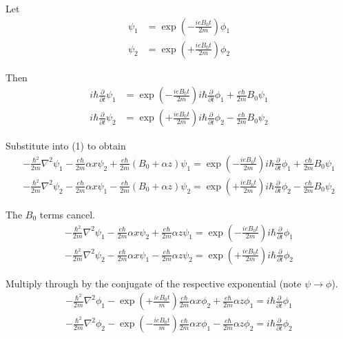 \bigskip
Let
\begin{align*}
\psi_1&=\exp\left(-\frac{ieB_0t}{2m}\right)\phi_1
\\
\psi_2&=\exp\left(+\frac{ieB_0t}{2m}\right)\phi_2
\end{align*}

Then
\begin{equation*}
\begin{aligned}
i\hbar\frac{\partial}{\partial t}\psi_1
&=\exp\left(-\frac{ieB_0t}{2m}\right)i\hbar\frac{\partial}{\partial t}\phi_1
+\frac{e\hbar}{2m}B_0\psi_1
\\
i\hbar\frac{\partial}{\partial t}\psi_2
&=\exp\left(+\frac{ieB_0t}{2m}\right)i\hbar\frac{\partial}{\partial t}\phi_2
-\frac{e\hbar}{2m}B_0\psi_2
\end{aligned}
\tag{2}
\end{equation*}

Substitute into (1) to obtain
\begin{align*}
-\frac{\hbar^2}{2m}\nabla^2\psi_1
-\frac{e\hbar}{2m}\alpha x\psi_2
+\frac{e\hbar}{2m}(B_0+\alpha z)\psi_1
=\exp\left(-\frac{ieB_0t}{2m}\right)i\hbar\frac{\partial}{\partial t}\phi_1
+\frac{e\hbar}{2m}B_0\psi_1
\\[1ex]
-\frac{\hbar^2}{2m}\nabla^2\psi_2
-\frac{e\hbar}{2m}\alpha x\psi_1
-\frac{e\hbar}{2m}(B_0+\alpha z)\psi_2
=\exp\left(+\frac{ieB_0t}{2m}\right)i\hbar\frac{\partial}{\partial t}\phi_2
-\frac{e\hbar}{2m}B_0\psi_2
\end{align*}

The $B_0$ terms cancel.
\begin{align*}
-\frac{\hbar^2}{2m}\nabla^2\psi_1
-\frac{e\hbar}{2m}\alpha x\psi_2
+\frac{e\hbar}{2m}\alpha z\psi_1
=\exp\left(-\frac{ieB_0t}{2m}\right)i\hbar\frac{\partial}{\partial t}\phi_1
\\[1ex]
-\frac{\hbar^2}{2m}\nabla^2\psi_2
-\frac{e\hbar}{2m}\alpha x\psi_1
-\frac{e\hbar}{2m}\alpha z\psi_2
=\exp\left(+\frac{ieB_0t}{2m}\right)i\hbar\frac{\partial}{\partial t}\phi_2
\end{align*}

Multiply through by the conjugate of the respective exponential
(note $\psi\rightarrow\phi$).
\begin{equation*}
\begin{aligned}
-\frac{\hbar^2}{2m}\nabla^2\phi_1
-\exp\left(+\frac{ieB_0t}{m}\right)\frac{e\hbar}{2m}\alpha x\phi_2
+\frac{e\hbar}{2m}\alpha z\phi_1
=i\hbar\frac{\partial}{\partial t}\phi_1
\\[1ex]
-\frac{\hbar^2}{2m}\nabla^2\phi_2
-\exp\left(-\frac{ieB_0t}{m}\right)\frac{e\hbar}{2m}\alpha x\phi_1
-\frac{e\hbar}{2m}\alpha z\phi_2
=i\hbar\frac{\partial}{\partial t}\phi_2
\end{aligned}
\tag{3}
\end{equation*}

